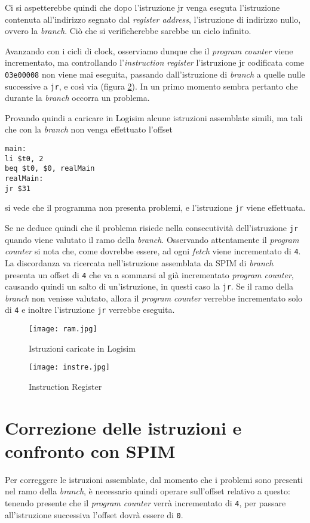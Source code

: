 \documentclass[a4paper]{article}
\begin{document}
Ci si aspetterebbe quindi che dopo l'istruzione jr venga eseguta l'istruzione contenuta all'indirizzo segnato dal {\itshape register address}, l'istruzione di indirizzo nullo, ovvero la {\itshape branch}. Ciò che si verificherebbe sarebbe un ciclo infinito.

Avanzando con i cicli di clock, osserviamo dunque che il {\itshape program counter} viene incrementato, ma controllando l'{\itshape instruction register} l'istruzione jr codificata come \texttt{03e00008} non viene mai eseguita, passando dall'istruzione di {\itshape branch} a quelle nulle successive a \texttt{jr}, e così via (figura \ref{fig2}).
In un primo momento sembra pertanto che durante la {\itshape branch} occorra un problema.

Provando quindi a caricare in Logisim alcune istruzioni assemblate simili, ma tali che con la {\itshape branch} non venga effettuato l'offset
\begin{verbatim}
main:
li $t0, 2
beq $t0, $0, realMain
realMain:
jr $31
\end{verbatim}
si vede che il programma non presenta problemi, e l'istruzione \texttt{jr} viene effettuata.

Se ne deduce quindi che il problema risiede nella consecutività dell'istruzione \texttt{jr} quando viene valutato il ramo della {\itshape branch}.
Osservando attentamente il {\itshape program counter} si nota che, come dovrebbe essere, ad ogni {\itshape fetch} viene incrementato di \texttt{4}. La discordanza va ricercata nell'istruzione assemblata da SPIM di {\itshape branch} presenta un offset di \texttt{4} che va a sommarsi al già incrementato {\itshape program counter}, causando quindi un salto di un'istruzione, in questi caso la \texttt{jr}. Se il ramo della {\itshape branch} non venisse valutato, allora il {\itshape program counter} verrebbe incrementato solo di \texttt{4} e inoltre l'istruzione \texttt{jr} verrebbe eseguita.
\begin{figure}
\centering
\caption{Istruzioni caricate in Logisim}
\texttt{[image: ram.jpg]}
\label{fig1}
\end{figure}
\begin{figure}
\centering
\caption{Instruction Register}
\texttt{[image: instre.jpg]}
\label{fig2}
\end{figure}
%
\section{Correzione delle istruzioni e confronto con SPIM}
Per correggere le istruzioni assemblate, dal momento che i problemi sono presenti nel ramo della {\itshape branch}, è necessario quindi operare sull'offset relativo a questo: tenendo presente che il {\itshape program counter} verrà incrementato di \texttt{4}, per passare all'istruzione successiva l'offset dovrà essere di \texttt{0}.
\end{document}
